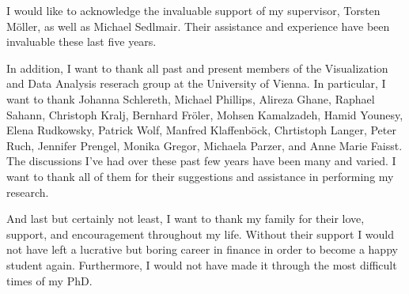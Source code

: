 
I would like to acknowledge the invaluable support of my supervisor, Torsten
M{\"o}ller, as well as Michael Sedlmair. Their assistance and experience have
been invaluable these last five years.

In addition, I want to thank all past and present members of the Visualization
and Data Analysis reserach group at the University of Vienna. In particular, I
want to thank Johanna Schlereth, Michael Phillips, Alireza Ghane, Raphael
Sahann, Christoph Kralj, Bernhard Fr{\"o}ler, Mohsen Kamalzadeh, Hamid Younesy,
Elena Rudkowsky, Patrick Wolf, Manfred Klaffenb{\"o}ck, Chrtistoph Langer,
Peter Ruch, Jennifer Prengel, Monika Gregor, Michaela Parzer, and Anne Marie
Faisst. The discussions I've had over these past few years have been many and
varied. I want to thank all of them for their suggestions and assistance in
performing my research.

And last but certainly not least, I want to thank my family for their love,
support, and encouragement throughout my life. Without their support I would
not have left a lucrative but boring career in finance in order to become a
happy student again. Furthermore, I would not have made it through the
most difficult times of my PhD.

